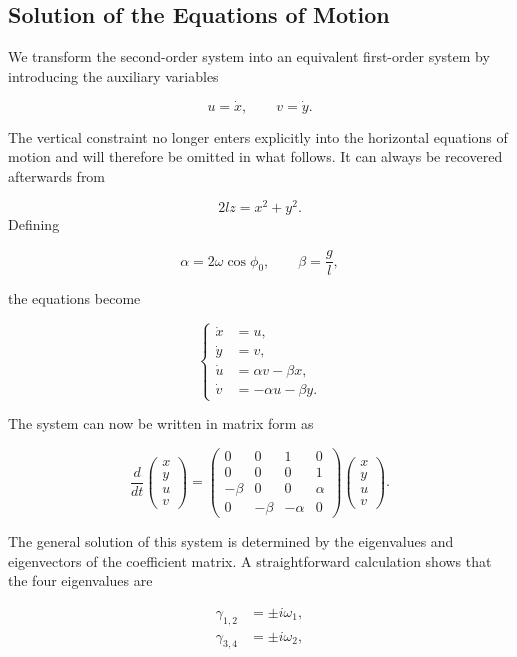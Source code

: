 \documentclass[12pt]{article}
\begin{document}
\subsection{Solution of the Equations of Motion}

We transform the second-order system into an equivalent first-order system by
introducing the auxiliary variables

\[
u=\dot{x},
\qquad
v=\dot{y}.
\]


The vertical constraint no longer enters explicitly into the horizontal equations
of motion and will therefore be omitted in what follows. It can always be
recovered afterwards from

\[
2lz=x^2+y^2.
\]
Defining

\[
\alpha=2\omega\cos\phi_0,
\qquad
\beta=\frac{g}{l},
\]

the equations become

\[
\left\{
\begin{aligned}
\dot{x} &= u,\\
\dot{y} &= v,\\
\dot{u} &= \alpha v-\beta x,\\
\dot{v} &= -\alpha u-\beta y.
\end{aligned}
\right.
\]

The system can now be written in matrix form as

\[
\frac{d}{dt}
\begin{pmatrix}
x\\
y\\
u\\
v
\end{pmatrix}
=
\begin{pmatrix}
0 & 0 & 1 & 0\\
0 & 0 & 0 & 1\\
-\beta & 0 & 0 & \alpha\\
0 & -\beta & -\alpha & 0
\end{pmatrix}
\begin{pmatrix}
x\\
y\\
u\\
v
\end{pmatrix}.
\]

The general solution of this system is determined by the eigenvalues and
eigenvectors of the coefficient matrix. A straightforward calculation shows
that the four eigenvalues are

\begin{align}
  \gamma_{1,2} &= \pm i\omega_1, \\
  \gamma_{3,4} &= \pm i\omega_2,
\end{align}
\end{document}
